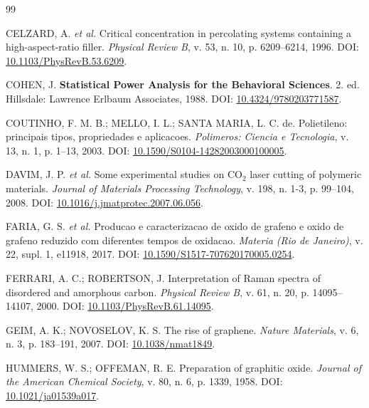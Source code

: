 \documentclass[11pt,a4paper,oneside]{article}
\begin{document}
\begin{thebibliography}{99}

 CELZARD, A. \textit{et al.} Critical concentration in percolating systems containing a high-aspect-ratio filler. \textit{Physical Review B}, v. 53, n. 10, p. 6209--6214, 1996. DOI: \href{https://doi.org/10.1103/PhysRevB.53.6209}{10.1103/PhysRevB.53.6209}.

 COHEN, J. \textbf{Statistical Power Analysis for the Behavioral Sciences}. 2. ed. Hillsdale: Lawrence Erlbaum Associates, 1988. DOI: \href{https://doi.org/10.4324/9780203771587}{10.4324/9780203771587}.

 COUTINHO, F. M. B.; MELLO, I. L.; SANTA MARIA, L. C. de. Polietileno: principais tipos, propriedades e aplicacoes. \textit{Polimeros: Ciencia e Tecnologia}, v. 13, n. 1, p. 1--13, 2003. DOI: \href{https://doi.org/10.1590/S0104-14282003000100005}{10.1590/S0104-14282003000100005}.

 DAVIM, J. P. \textit{et al.} Some experimental studies on CO$_2$ laser cutting of polymeric materials. \textit{Journal of Materials Processing Technology}, v. 198, n. 1-3, p. 99--104, 2008. DOI: \href{https://doi.org/10.1016/j.jmatprotec.2007.06.056}{10.1016/j.jmatprotec.2007.06.056}.

 FARIA, G. S. \textit{et al.} Producao e caracterizacao de oxido de grafeno e oxido de grafeno reduzido com diferentes tempos de oxidacao. \textit{Materia (Rio de Janeiro)}, v. 22, supl. 1, e11918, 2017. DOI: \href{https://doi.org/10.1590/S1517-707620170005.0254}{10.1590/S1517-707620170005.0254}.

 FERRARI, A. C.; ROBERTSON, J. Interpretation of Raman spectra of disordered and amorphous carbon. \textit{Physical Review B}, v. 61, n. 20, p. 14095--14107, 2000. DOI: \href{https://doi.org/10.1103/PhysRevB.61.14095}{10.1103/PhysRevB.61.14095}.

 GEIM, A. K.; NOVOSELOV, K. S. The rise of graphene. \textit{Nature Materials}, v. 6, n. 3, p. 183--191, 2007. DOI: \href{https://doi.org/10.1038/nmat1849}{10.1038/nmat1849}.

 HUMMERS, W. S.; OFFEMAN, R. E. Preparation of graphitic oxide. \textit{Journal of the American Chemical Society}, v. 80, n. 6, p. 1339, 1958. DOI: \href{https://doi.org/10.1021/ja01539a017}{10.1021/ja01539a017}.


\end{thebibliography}
\end{document}

